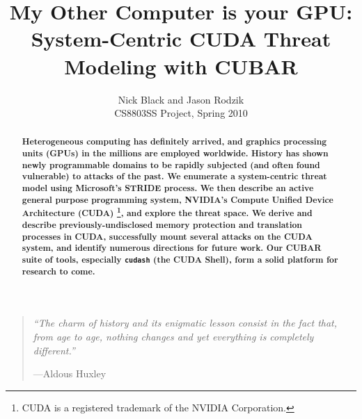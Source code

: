 \documentclass[letterpaper,10pt]{article}
\title{My Other Computer is your GPU:\\
System-Centric CUDA Threat Modeling with CUBAR}
\author{Nick Black and Jason Rodzik\\
CS8803SS Project, Spring 2010}
\date{}
\begin{document}
\maketitle

\begin{quotation}\scriptsize\textit{``The charm of history and its enigmatic lesson consist in the fact that, from age to age, nothing changes and yet everything is completely different.''}

\hfill---Aldous Huxley \end{quotation}

\begin{abstract}
\textbf{Heterogeneous computing has definitely arrived, and graphics processing
units (GPUs) in the millions are employed worldwide. History has shown newly
programmable domains to be rapidly subjected (and often found vulnerable) to
attacks of the past. We enumerate a system-centric threat model using Microsoft's
STRIDE process\cite{stride}. We then describe an active general purpose
programming system, NVIDIA's Compute Unified Device Architecture
(CUDA) \footnote{CUDA\textsuperscript{\textregistered} is a registered
trademark of the NVIDIA Corporation.}, and explore the threat space. We derive
and describe previously-undisclosed memory protection and translation processes
in CUDA, successfully mount several attacks on the CUDA system, and identify
numerous directions for future work. Our CUBAR suite of tools, especially \texttt{cudash}
(the CUDA Shell), form a solid platform for research to come.}

\begin{comment}
With high powered GPUs moving from the gamer's desktop to the laboratory's cluster, it's essential that the security issues surrounding their use be fleshed out earlier rather than later. Unfortunately, this is not the case; graphics card manufacturers have not publicized any of their own internal security studies (if any exist), and popular manufacturers are infamous for their
hostility to open source and academia\footnote{See for instance Wikipedia's page on
``\href{http://en.wikipedia.org/wiki/NVIDIA\_and\_FOSS}{Graphics hardware and FOSS}''.}
\end{comment}

\end{abstract}
\end{document}
